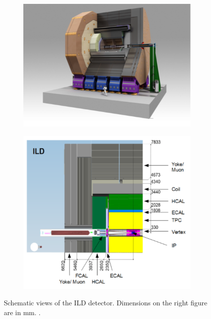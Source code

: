 \begin{figure}[htbp!]
  \centering
  \begin{subfigure}[t]{0.49\textwidth}
    \includegraphics[width=1.\linewidth]{chap2/fig/ILD_full.png}
  \end{subfigure}
  \hfill
  \begin{subfigure}[t]{0.49\textwidth}
    \includegraphics[width=1.\linewidth]{chap2/fig/ILD_layout.png}
  \end{subfigure}
  \caption{Schematic views of the ILD detector. Dimensions on the right figure are in mm. \cite{ILC_TDR_Vol4}.} \label{fig:ILD}
\end{figure}

